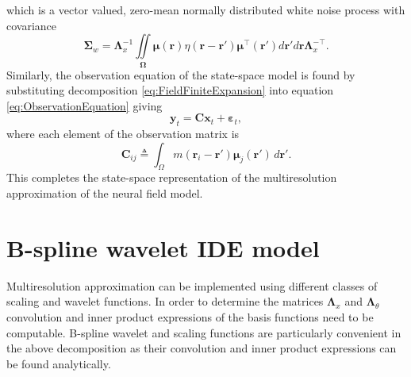 \documentclass[journal,a4paper]{IEEEtran}
\newcommand{\parham}[1]{\textsf{\emph{\textbf{\textcolor{blue}{#1}}}}}
\begin{document}
which is a vector valued, zero-mean normally distributed white noise process with covariance \cite{Scerri2009}
\begin{equation}
\boldsymbol\Sigma_w =\mathbf{\Lambda}_{x}^{-1}\iint\limits_{\boldsymbol\Omega}\boldsymbol\mu\left(\mathbf{r}\right)\eta\left(\mathbf{r}-\mathbf{r'}\right)\boldsymbol\mu^{\top}\left(\mathbf{r'}\right)d\mathbf{r'}d\mathbf{r}\mathbf{\Lambda}_{x}^{-\top}.
\end{equation}
Similarly, the observation equation of the state-space model is found by substituting decomposition \eqref{eq:FieldFiniteExpansion}
 into equation \eqref{eq:ObservationEquation} giving
\begin{equation}\label{ObservationEquation} 
	\mathbf{y}_t = \mathbf{C}\mathbf{x}_t + \boldsymbol{\varepsilon}_t,
\end{equation}
where each element of the observation matrix is 
\begin{equation}
	\mathbf{C}_{ij} \triangleq \int_{\Omega}m(\mathbf{r}_i - \mathbf{r}')\boldsymbol{\mu}_j(\mathbf{r}') \, d\mathbf{r}'.
\end{equation}
This completes the state-space representation of the multiresolution approximation of the neural field model. 
\section{B-spline wavelet IDE model}
Multiresolution approximation can be implemented using different classes of scaling and wavelet functions. In order to determine the matrices $ \boldsymbol\Lambda_x$ and $\boldsymbol \Lambda_{\theta}$ convolution and inner product expressions of the basis functions need to be computable. B-spline wavelet and scaling functions are particularly convenient in the above decomposition as their convolution and inner product expressions can be found analytically.
\end{document}
